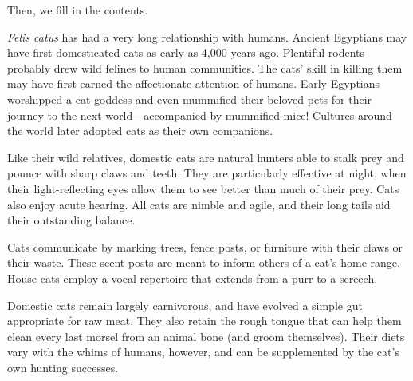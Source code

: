 \documentclass[a4paper,12pt]{article}
\begin{document}
Then, we fill in the contents.

\begin{tcolorbox}[parbox=false]
\emph{Felis catus} has had a very long relationship with humans. Ancient Egyptians may have first domesticated cats as early as 4,000 years ago. Plentiful rodents probably drew wild felines to human communities. The cats' skill in killing them may have first earned the affectionate attention of humans. Early Egyptians worshipped a cat goddess and even mummified their beloved pets for their journey to the next world—accompanied by mummified mice! Cultures around the world later adopted cats as their own companions.

Like their wild relatives, domestic cats are natural hunters able to stalk prey and pounce with sharp claws and teeth. They are particularly effective at night, when their light-reflecting eyes allow them to see better than much of their prey. Cats also enjoy acute hearing. All cats are nimble and agile, and their long tails aid their outstanding balance. \par


Cats communicate by marking trees, fence posts, or furniture with their claws or their waste. These scent posts are meant to inform others of a cat's home range. House cats employ a vocal repertoire that extends from a purr to a screech.


Domestic cats remain largely carnivorous, and have evolved a simple gut appropriate for raw meat. They also retain the rough tongue that can help them clean every last morsel from an animal bone (and groom themselves). Their diets vary with the whims of humans, however, and can be supplemented by the cat's own hunting successes.
\end{tcolorbox}
\end{document}
